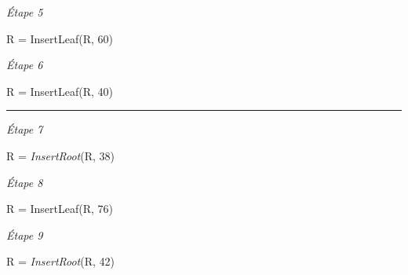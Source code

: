 \documentclass[11pt,a4paper]{article}
\begin{document}
\begin{center}
\begin{table}[ht!]
\begin{minipage}{0.33\textwidth}
\textit{\'Etape 5}

R = InsertLeaf(R, 60)

\vspace*{6cm}

  \end{minipage}
  \hfillx
  \begin{minipage}{0.33\textwidth}
    \centering

\textit{\'Etape 6}

R = InsertLeaf(R, 40)

\vspace*{6cm}

  \end{minipage}
\end{table}

\vspace*{-0.5cm}
\rule{1.0\linewidth}{0.75pt}



\begin{table}[ht!]
  \centering
  \begin{minipage}{0.50\textwidth}
    \centering

\textit{\'Etape 7}

R = \textit{InsertRoot}(R, 38)

\vspace*{7cm}

  \end{minipage}
  \hfillx
  \begin{minipage}{0.50\textwidth}
    \centering

\textit{\'Etape 8}

R = InsertLeaf(R, 76)

\vspace*{7cm}

  \end{minipage}
\end{table}

\clearpage


\begin{table}[ht!]
  \centering
  \begin{minipage}{0.50\textwidth}
    \centering

\textit{\'Etape 9}

R = \textit{InsertRoot}(R, 42)

\vspace*{7cm}

  \end{minipage}
  \hfillx
  \begin{minipage}{0.50\textwidth}
    \centering


\end{minipage}
\end{table}
\end{center}
\end{document}
